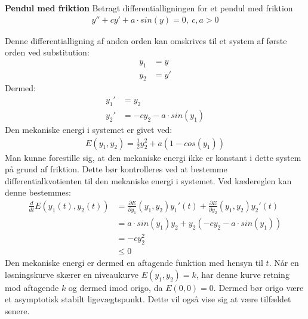 \begin{Example}\textbf{Pendul med friktion}\label{friktion}
\hfill \break
\textnormal{Betragt differentialligningen for et pendul med friktion}\hfill \break
\begin{align*}
y''+cy'+a\cdot sin(y)=0, \ c,a > 0
\end{align*}

\textnormal{Denne differentialligning af anden orden kan omskrives til et system af første orden ved substitution:}
\begin{align*}
y_1&=y \\
y_2&=y'
\end{align*}
\textnormal{Dermed:}
\begin{align*}
y_1'&=y_2 \\
y_2'&=-cy_2-a\cdot sin(y_1)
\end{align*}
\textnormal{Den mekaniske energi i systemet er givet ved:}
\begin{align}
E(y_1,y_2)=\frac{1}{2}y_2^2+a(1-cos(y_1))
\end{align}
\textnormal{Man kunne forestille sig, at den mekaniske energi ikke er konstant i dette system på grund af friktion. Dette bør kontrolleres ved at bestemme differentialkvotienten til den mekaniske energi i systemet. Ved kædereglen kan denne bestemmes:}
\begin{align*}
\frac{d}{dt}E(y_1(t),y_2(t))&=\frac{\partial E}{\partial y_1}(y_1,y_2)y_1'(t)+\frac{\partial E}{\partial y_2}(y_1,y_2)y_2'(t)\\
&=a\cdot sin(y_1)y_2+y_2(-cy_2-a\cdot sin(y_1))\\
&=-cy_2^2\\
&\leq 0
\end{align*}
\textnormal{Den mekaniske energi er dermed en aftagende funktion med hensyn til $t$. Når en løsningskurve skærer en niveaukurve $E(y_1,y_2)=k$, har denne kurve retning mod aftagende $k$ og dermed imod origo, da $E(0,0)=0$. Dermed bør origo være et asymptotisk stabilt ligevægtspunkt. Dette vil også vise sig at være tilfældet senere.}
\end{Example}
